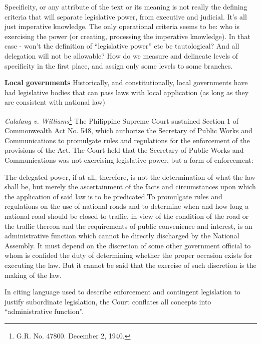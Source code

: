 \documentclass[../main.tex]{subfiles}
\begin{document}
\begin{shaded}
Specificity, or any attribute of the text or its meaning is not really the defining criteria that will separate legislative power, from executive and judicial. It’s all just imperative knowledge. The only operational criteria seems to be: who is exercising the power (or creating, processing the imperative knowledge). In that case - won’t the definition of “legislative power” etc be tautological? And all delegation will not be allowable? How do we measure and delineate levels of specificity in the first place, and assign only some levels to some branches.

\end{shaded}

\textbf{Local governments} Historically, and constitutionally, local governments have had legislative bodies that can pass laws with local application (as long as they are consistent with national law)

\textit{Calalang v. Williams}\footnote{G.R. No. 47800. December 2, 1940.} The Philippine Supreme Court sustained Section 1 of Commonwealth Act No. 548, which authorize the Secretary of Public Works and Communications to promulgate rules and regulations for the enforcement of the provisions of the Act. The Court held that the Secretary of Public Works and Communications was not exercising legislative power, but a form of enforcement:

\begin{displayquote}
The delegated power, if at all, therefore, is not the determination of what the law shall be, but merely the ascertainment of the facts and circumstances upon which the application of said law is to be predicated.To promulgate rules and regulations on the use of national roads and to determine when and how long a national road should be closed to traffic, in view of the condition of the road or the traffic thereon and the requirements of public convenience and interest, is an administrative function which cannot be directly discharged by the National Assembly. It must depend on the discretion of some other government official to whom is confided the duty of determining whether the proper occasion exists for executing the law. But it cannot be said that the exercise of such
discretion is the making of the law.
\end{displayquote}

In citing language used to describe enforcement and contingent legislation to justify subordinate legislation, the Court conflates all concepts into \enquote{administrative function}.
\end{document}
